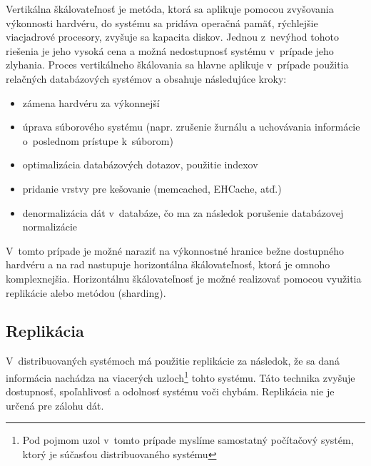 \documentclass[11pt,twoside,a4paper]{book}
\begin{document}
Vertikálna škálovateľnosť je metóda, ktorá sa aplikuje pomocou zvyšovania výkonnosti hardvéru, do systému sa pridáva operačná pamäť, rýchlejšie viacjadrové procesory, zvyšuje sa kapacita diskov. Jednou z~nevýhod tohoto riešenia je jeho vysoká cena a možná nedostupnosť systému v~prípade jeho zlyhania.
Proces vertikálneho škálovania sa hlavne aplikuje v~prípade použitia relačných databázových systémov  a obsahuje následujúce kroky:
\begin{itemize}
 \item zámena hardvéru za výkonnejší
 \item úprava súborového systému (napr. zrušenie žurnálu a uchovávania informácie o~poslednom prístupe k~súborom)
 \item optimalizácia databázových dotazov, použitie indexov
 \item pridanie vrstvy pre kešovanie (memcached, EHCache, atď.)
 \item denormalizácia dát v~databáze, čo ma za následok porušenie databázovej normalizácie
\end{itemize}

V~tomto prípade je možné naraziť na výkonnostné hranice bežne dostupného hardvéru a na rad nastupuje horizontálna škálovateľnosť, ktorá je omnoho komplexnejšia. Horizontálnu škálovateľnosť je možné realizovať pomocou využitia replikácie alebo metódou \emph{} (sharding).

\subsection{Replikácia}

V~distribuovaných systémoch má použitie replikácie za následok, že sa daná informácia nachádza na viacerých uzloch\footnote{Pod pojmom uzol v~tomto prípade myslíme samostatný počítačový systém, ktorý je súčasťou distribuovaného systému} tohto systému. Táto technika zvyšuje dostupnosť, spoľahlivosť a odolnosť systému voči chybám. Replikácia nie je určená pre zálohu dát. 
\end{document}
